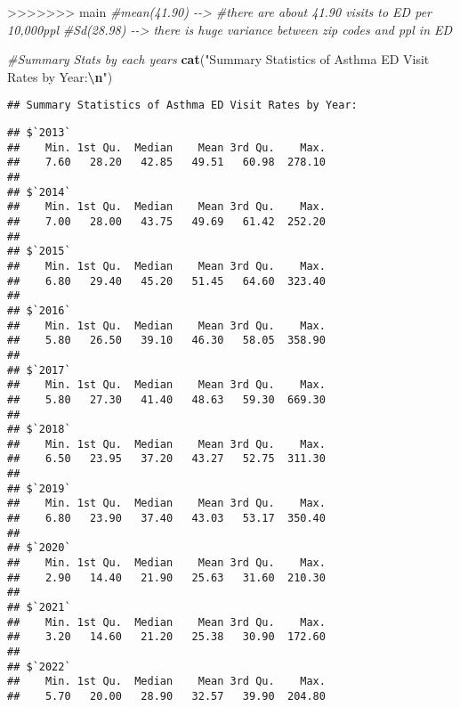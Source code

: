 \documentclass[
]{article}
\newenvironment{Shaded}{\begin{snugshade}}{\end{snugshade}}
\newcommand{\AttributeTok}[1]{\textcolor[rgb]{0.13,0.29,0.53}{#1}}
\newcommand{\CommentTok}[1]{\textcolor[rgb]{0.56,0.35,0.01}{\textit{#1}}}
\newcommand{\ConstantTok}[1]{\textcolor[rgb]{0.56,0.35,0.01}{#1}}
\newcommand{\FunctionTok}[1]{\textcolor[rgb]{0.13,0.29,0.53}{\textbf{#1}}}
\newcommand{\NormalTok}[1]{#1}
\newcommand{\SpecialCharTok}[1]{\textcolor[rgb]{0.81,0.36,0.00}{\textbf{#1}}}
\newcommand{\StringTok}[1]{\textcolor[rgb]{0.31,0.60,0.02}{#1}}
\begin{document}
\begin{Shaded}
\begin{Highlighting}[]
>>>>>>> main
\CommentTok{\#mean(41.90) {-}{-}\textgreater{} \#there are about 41.90 visits to ED per 10,000ppl}
\CommentTok{\#Sd(28.98) {-}{-}\textgreater{} there is huge variance between zip codes and ppl in ED }
\end{Highlighting}
\end{Shaded}

\begin{Shaded}
\begin{Highlighting}[]
\CommentTok{\#Summary Stats by each years}
\FunctionTok{cat}\NormalTok{(}\StringTok{"Summary Statistics of Asthma ED Visit Rates by Year:}\SpecialCharTok{\textbackslash{}n}\StringTok{"}\NormalTok{)}
\end{Highlighting}
\end{Shaded}

\begin{verbatim}
## Summary Statistics of Asthma ED Visit Rates by Year:
\end{verbatim}

\begin{Shaded}
\end{Shaded}

\begin{verbatim}
## $`2013`
##    Min. 1st Qu.  Median    Mean 3rd Qu.    Max. 
##    7.60   28.20   42.85   49.51   60.98  278.10 
## 
## $`2014`
##    Min. 1st Qu.  Median    Mean 3rd Qu.    Max. 
##    7.00   28.00   43.75   49.69   61.42  252.20 
## 
## $`2015`
##    Min. 1st Qu.  Median    Mean 3rd Qu.    Max. 
##    6.80   29.40   45.20   51.45   64.60  323.40 
## 
## $`2016`
##    Min. 1st Qu.  Median    Mean 3rd Qu.    Max. 
##    5.80   26.50   39.10   46.30   58.05  358.90 
## 
## $`2017`
##    Min. 1st Qu.  Median    Mean 3rd Qu.    Max. 
##    5.80   27.30   41.40   48.63   59.30  669.30 
## 
## $`2018`
##    Min. 1st Qu.  Median    Mean 3rd Qu.    Max. 
##    6.50   23.95   37.20   43.27   52.75  311.30 
## 
## $`2019`
##    Min. 1st Qu.  Median    Mean 3rd Qu.    Max. 
##    6.80   23.90   37.40   43.03   53.17  350.40 
## 
## $`2020`
##    Min. 1st Qu.  Median    Mean 3rd Qu.    Max. 
##    2.90   14.40   21.90   25.63   31.60  210.30 
## 
## $`2021`
##    Min. 1st Qu.  Median    Mean 3rd Qu.    Max. 
##    3.20   14.60   21.20   25.38   30.90  172.60 
## 
## $`2022`
##    Min. 1st Qu.  Median    Mean 3rd Qu.    Max. 
##    5.70   20.00   28.90   32.57   39.90  204.80
\end{verbatim}
\end{document}
